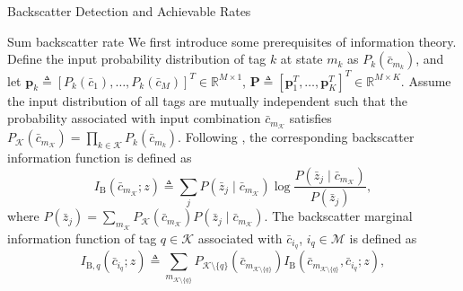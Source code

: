 \documentclass[journal]{IEEEtran}
\begin{document}
\begin{section}{Backscatter Detection and Achievable Rates}
		\begin{subsection}{Sum backscatter rate}
			We first introduce some prerequisites of information theory. Define the input probability distribution of tag $k$ at state $m_k$ as $P_k(\bar{c}_{m_k})$, and let $\boldsymbol{p}_k \triangleq [P_k(\bar{c}_1),\ldots,P_k(\bar{c}_M)]^T \in \mathbb{R}^{M \times 1}$, $\boldsymbol{P} \triangleq [\boldsymbol{p}_1^T,\ldots,\boldsymbol{p}_K^T]^T \in \mathbb{R}^{M \times K}$. Assume the input distribution of all tags are mutually independent such that the probability associated with input combination $\bar{c}_{m_{\mathcal{K}}}$ satisfies $P_{\mathcal{K}}(\bar{c}_{m_{\mathcal{K}}}) = \prod_{k \in \mathcal{K}} P_k(\bar{c}_{m_k})$. Following \cite{Rezaeian2004}, the corresponding backscatter information function is defined as
			\begin{equation}
				I_{\mathrm{B}}(\bar{c}_{m_{\mathcal{K}}};z) \triangleq \sum_j P(\bar{z}_j \mid \bar{c}_{m_{\mathcal{K}}}) \log \frac{P(\bar{z}_j \mid \bar{c}_{m_{\mathcal{K}}})}{P(\bar{z}_j)},
				\label{eq:backscatter_information_function}
			\end{equation}
			where $P(\bar{z}_j) = \sum_{m_{\mathcal{K}}} P_{\mathcal{K}}(\bar{c}_{m_{\mathcal{K}}}) P(\bar{z}_j \mid \bar{c}_{m_{\mathcal{K}}})$.
			The backscatter marginal information function of tag $q \in \mathcal{K}$ associated with $\bar{c}_{i_q}$, $i_q \in \mathcal{M}$ is defined as
			\begin{equation}
				I_{\mathrm{B},q}(\bar{c}_{i_q};z) \triangleq \sum_{m_{\mathcal{K} \setminus \{q\}}} P_{\mathcal{K} \setminus \{q\}}(\bar{c}_{m_{\mathcal{K} \setminus \{q\}}}) I_{\mathrm{B}}(\bar{c}_{m_{\mathcal{K} \setminus \{q\}}},\bar{c}_{i_q};z),
				\label{eq:backscatter_marginal_information_function}
			\end{equation}

\end{subsection}
\end{section}
\end{document}
